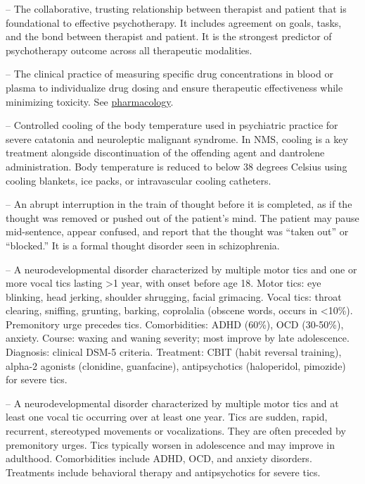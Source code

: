 -- The collaborative, trusting relationship between therapist and patient that is foundational to effective psychotherapy. It includes agreement on goals, tasks, and the bond between therapist and patient. It is the strongest predictor of psychotherapy outcome across all therapeutic modalities.

-- The clinical practice of measuring specific drug concentrations in blood or plasma to individualize drug dosing and ensure therapeutic effectiveness while minimizing toxicity. See \hyperlink{Pharmacology}{pharmacology}.

-- Controlled cooling of the body temperature used in psychiatric practice for severe catatonia and neuroleptic malignant syndrome. In NMS, cooling is a key treatment alongside discontinuation of the offending agent and dantrolene administration. Body temperature is reduced to below 38 degrees Celsius using cooling blankets, ice packs, or intravascular cooling catheters.

-- An abrupt interruption in the train of thought before it is completed, as if the thought was removed or pushed out of the patient's mind. The patient may pause mid-sentence, appear confused, and report that the thought was ``taken out'' or ``blocked.'' It is a formal thought disorder seen in schizophrenia.

-- A neurodevelopmental disorder characterized by multiple motor tics and one or more vocal tics lasting >1 year, with onset before age 18. Motor tics: eye blinking, head jerking, shoulder shrugging, facial grimacing. Vocal tics: throat clearing, sniffing, grunting, barking, coprolalia (obscene words, occurs in <10\%). Premonitory urge precedes tics. Comorbidities: ADHD (60\%), OCD (30-50\%), anxiety. Course: waxing and waning severity; most improve by late adolescence. Diagnosis: clinical DSM-5 criteria. Treatment: CBIT (habit reversal training), alpha-2 agonists (clonidine, guanfacine), antipsychotics (haloperidol, pimozide) for severe tics.

-- A neurodevelopmental disorder characterized by multiple motor tics and at least one vocal tic occurring over at least one year. Tics are sudden, rapid, recurrent, stereotyped movements or vocalizations. They are often preceded by premonitory urges. Tics typically worsen in adolescence and may improve in adulthood. Comorbidities include ADHD, OCD, and anxiety disorders. Treatments include behavioral therapy and antipsychotics for severe tics.

